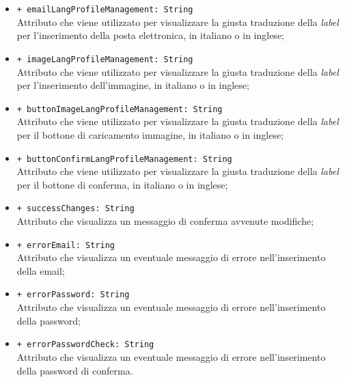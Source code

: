 \begin{itemize}
\begin{itemize}
		\item \texttt{+ emailLangProfileManagement: String} \\ Attributo che viene utilizzato per visualizzare la giusta traduzione della \textit{label} per l'inserimento della posta elettronica, in italiano o in inglese;
		\item \texttt{+ imageLangProfileManagement: String} \\ Attributo che viene utilizzato per visualizzare la giusta traduzione della \textit{label} per l'inserimento dell'immagine, in italiano o in inglese;
		\item \texttt{+ buttonImageLangProfileManagement: String} \\ Attributo che viene utilizzato per visualizzare la giusta traduzione della \textit{label} per il bottone di caricamento immagine, in italiano o in inglese;
		\item \texttt{+ buttonConfirmLangProfileManagement: String} \\ Attributo che viene utilizzato per visualizzare la giusta traduzione della \textit{label} per il bottone di conferma, in italiano o in inglese;
		\item \texttt{+ successChanges: String} \\ Attributo che visualizza un messaggio di conferma avvenute modifiche;
		\item \texttt{+ errorEmail: String} \\ Attributo che visualizza un eventuale messaggio di errore nell'inserimento della email;
		\item \texttt{+ errorPassword: String} \\ Attributo che visualizza un eventuale messaggio di errore nell'inserimento della password;
		\item \texttt{+ errorPasswordCheck: String} \\ Attributo che visualizza un eventuale messaggio di errore nell'inserimento della password di conferma.
	\end{itemize}
\end{itemize}